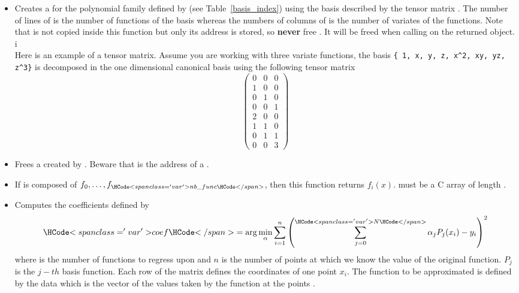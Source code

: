\begin{itemize}
  \item {}
    \sshortdescribe Creates a  for the polynomial family
    defined by  (see Table~\ref{basis_index}) using the basis
    described by the tensor matrix . The number of lines of  is
    the number of functions of the basis whereas the numbers of columns of
     is the number of variates of the functions.
    Note that  is not copied inside this function but only its address is
    stored, so {\bf never} free . It will be freed when calling
     on the returned object. i\\
    Here is an example of a tensor matrix. Assume you are working with three
    variate functions, the basis \verb!{ 1, x, y, z, x^2, xy, yz, z^3}! is
    decomposed in the one dimensional canonical basis using the following tensor
    matrix
    \[ \left(
    \begin{array}{ccc}
      0 & 0 & 0 \\
      1 & 0 & 0 \\
      0 & 1 & 0 \\
      0 & 0 & 1 \\
      2 & 0 & 0 \\
      1 & 1 & 0 \\
      0 & 1 & 1\\
      0 & 0 & 3
    \end{array}
    \right) \]
    
  \item  {}
    \sshortdescribe Frees a  created by
    . Beware that  is the address of a
    \ptr.

  \item  {}
    \sshortdescribe If  is composed of $f_0, \dots, f_{\var{nb\_func}}$,
    then this function returns $f_i(x)$.  must be a C array of length
    .

  \item {}
    \sshortdescribe Computes the coefficients  defined by
    \begin{equation*}
      \var{coef} = \arg\min_\alpha \sum_{i=1}^n
      \left( \sum_{j=0}^{\var{N}} \alpha_j  P_j(x_i) - y_i\right)^2
    \end{equation*}
    where  is the number of functions to regress upon and $n$ is the
    number of points at which we know the value of the original function. $P_j$
    is the $j-th$ basis function. Each row of the matrix  defines the
    coordinates of one point $x_i$. The function to be approximated is defined
    by the data  which is the vector of the values taken by the function
    at the points .


\end{itemize}
